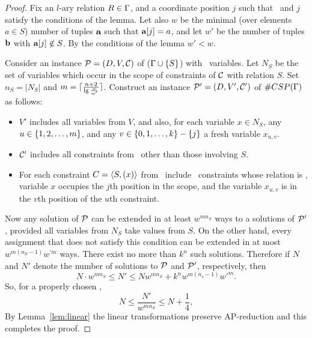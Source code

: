 \begin{proof} 
Fix an \(l\)-ary relation \(R \in \Gamma\)\@, and 
a coordinate position \(j\) such that \mR\ and \(j\) satisfy the conditions of the lemma.
Let also \(w\) be the minimal (over elements \(a\in S\)) number of tuples \(\textbf{a}\)
such that \(\textbf{a}[j]=a\), and let \(w'\) be the number of tuples \(\textbf{b}\) with
\(\textbf{a}[j] \notin S\). By the conditions of the lemma \(w'<w\)\@.

Consider an instance \(\mathcal{P}=(D,V,\mathcal{C})\) of \ccsp(\(\Gamma \cup \{{S}\}\))
with \mn\ variables. Let \(N_S\) be the set of
variables which occur in the scope of constraints of \(\mathcal{C}\) with relation \(S\)\@. 
Set \(n_S = |N_S|\) and \(m = \lceil\frac{n+2}{\lg{\frac{w}{w'}}}\rceil\)\@.
Construct an instance \(\mathcal{P}'=(D,V',\mathcal{C}')\) of \(\#CSP(\Gamma)\) as follows:
\begin{itemize}
\item
\(V'\) includes all variables from \(V\),
and also, for each variable \(x \in N_S\), any \(u \in \{{{1,2,\dotsc,m}}\}\), and any
\(v\in\{{0,1,\dotsc,k}\}-\{j\}\) a fresh variable \(x_{u,v}\)\@. 
\item 
\(\mathcal{C}'\) includes all constraints from \mconset\ other than those involving \(S\)\@. 
\item
For each constraint \(C=\langle S, (x) \rangle\) from \mconset\ include \mm\ constraints whose
relation is \mR, variable \(x\) occupies the \(j\)th position in the scope,
and the variable \(x_{u,v}\) is in the \(v\)th position of the \(u\)th constraint.
\end{itemize}

Now any solution of \(\mathcal{P}\) can be extended in at least \(w^{mn_S}\) 
ways to a solutions of \(\mathcal{P}'\)\@, provided all variables from \(N_S\)
take values from \(S\)\@. On the other hand, every assignment that does not satisfy this
condition can be extended in at most \(w^{m(n_S-1)}w^{\prime m}\) ways.
There exist no more than \(k^n\) such solutions. Therefore if \(N\) and \(N'\)
denote the number of solutions to \(\mathcal{P}\) and \(\mathcal{P}'\), respectively, then
\[N\cdot w^{mn_S} \le N' \le Nw^{mn_S} + k^nw^{m(n_s-1)}w'^m.\]
So, for a properly chosen \mm, 
\[N \le \frac{N'}{w^{mn_S}} \le N + \frac{1}{4},\]
By Lemma~\ref{lem:linear} the linear transformations preserve AP-reduction
and this completes the proof.
\end{proof}

